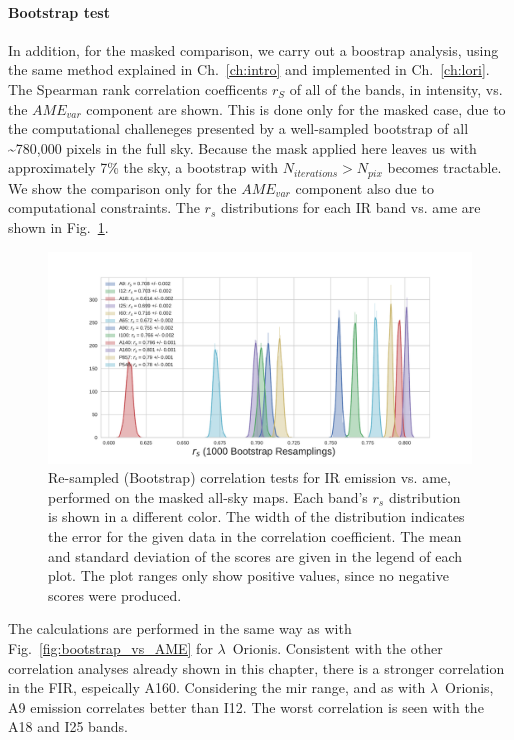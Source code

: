           \paragraph{Bootstrap test}
              In addition, for the masked comparison, we carry out a boostrap analysis, using the same method explained in Ch.~\ref{ch:intro} and implemented in Ch.~\ref{ch:lori}. The Spearman rank correlation coefficents $r_{S}$ of all of the bands, in intensity, vs. the $AME_{var}$ component are shown. This is done only for the masked case, due to the computational challeneges presented by a well-sampled bootstrap of all \textasciitilde{}780,000 pixels in the full sky. Because the mask applied here leaves us with approximately 7\% the sky, a bootstrap with $N_{iterations} > N_{pix}$ becomes tractable. We show the comparison only for the $AME_{var}$ component also due to computational constraints. The $r_{s}$ distributions for each IR band vs. \gls{ame} are shown in Fig.~\ref{fig:bootstrap_vs_AME_allsky_masked}.
                \begin{figure}
                     \includegraphics[width=\textwidth,trim={3cm 0.25cm 2.5cm 1cm},clip]{../Plots/ch_allsky/bootstrap_vs_AME_spearman_maskall_i1000.pdf}
                     \centering
                     \caption{Re-sampled (Bootstrap) correlation tests for IR emission vs. \gls{ame}, performed on the masked all-sky maps. Each band's $r_{s}$ distribution is shown in a different color. The width of the distribution indicates the error for the given data in the correlation coefficient. The mean and standard deviation of the scores are given in the legend of each plot. The plot ranges only show positive values, since no negative scores were produced. }
                     \label{fig:bootstrap_vs_AME_allsky_masked}
                \end{figure}
            The calculations are performed in the same way as with Fig.~\ref{fig:bootstrap_vs_AME} for $\lambda$~Orionis. Consistent with the other correlation analyses already shown in this chapter, there is a stronger correlation in the FIR, espeically A160. Considering the \gls{mir} range, and as with $\lambda$~Orionis, A9 emission correlates better than I12. The worst correlation is seen with the A18 and I25 bands.
